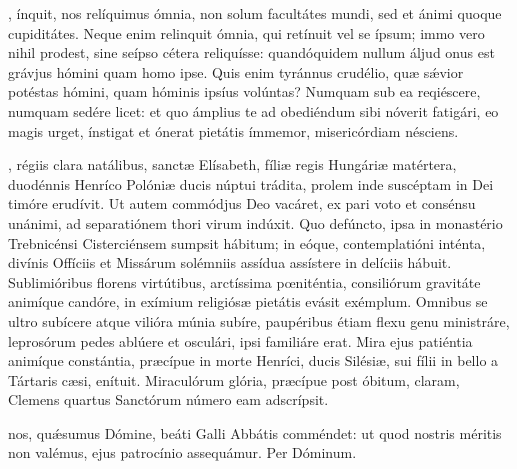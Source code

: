 \documentclass[fontsize=9pt,paper=A6,twoside,BCOR=1mm,DIV=22,headinclude]{scrarticle}
\begin{document}
\begin{multicols}{2}
\RVCvii

, ínquit, nos relíquimus ómnia, non solum facultátes mundi, sed et ánimi quoque cupiditátes. Neque enim relinquit ómnia, qui retínuit vel se ípsum; immo vero nihil prodest, sine seípso cétera reliquísse: quandóquidem nullum áljud onus est grávjus hómini quam homo ipse. Quis enim tyránnus crudélio, quæ s\'ævior potéstas hómini, quam hóminis ipsíus volúntas? Numquam sub ea reqiéscere, numquam sedére licet: et quo ámplius te ad obediéndum sibi nóverit fatigári, eo magis urget, ínstigat et ónerat pietátis ímmemor, misericórdiam nésciens. 

\RVCviii

, régiis clara natálibus, sanctæ Elísabeth, fíliæ regis Hungáriæ matértera, duodénnis Henríco Polóniæ ducis núptui trádita, prolem inde suscéptam in Dei timóre erudívit. Ut autem commódjus Deo vacáret, ex pari voto et consénsu unánimi, ad separatiónem thori virum indúxit. Quo defúncto, ipsa in monastério Trebnicénsi Cisterciénsem sumpsit hábitum; in eóque, contemplatióni inténta, divínis Offíciis et Missárum solémniis assídua assístere in delíciis hábuit. Sublimióribus florens virtútibus, arctíssima pœniténtia, consiliórum gravitáte animíque candóre, in exímium religiósæ pietátis evásit exémplum. Omnibus se ultro subícere atque vilióra múnia subíre, paupéribus étiam flexu genu ministráre, leprosórum pedes ablúere et osculári, ipsi familiáre erat. Mira ejus patiéntia animíque constántia, præcípue in morte Henríci, ducis Silésiæ, sui fílii in bello a Tártaris cæsi, enítuit. Miraculórum glória, præcípue post óbitum, claram, Clemens quartus Sanctórum número eam adscrípsit.

\Te 

{

\VRCii

\BC

 nos, qu\'æsumus Dómine, beáti Galli Abbátis comméndet: ut quod nostris méritis non valémus, ejus patrocínio assequámur. Per Dóminum.

}
\end{multicols}
\end{document}
